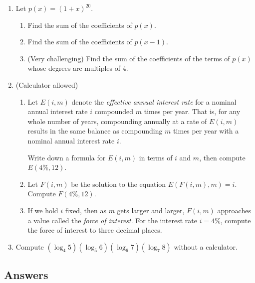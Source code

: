 \begin{enumerate}[resume]
\item Let $p(x) = (1 + x)^{20}$.
\begin{enumerate}
\item Find the sum of the coefficients of $p(x)$.
\item Find the sum of the coefficients of $p(x - 1)$.
\item (Very challenging) Find the sum of the coefficients of the terms of $p(x)$ whose degrees are multiples of $4$.
\end{enumerate}
\item (Calculator allowed)
\begin{enumerate}
\item Let $E(i,m)$ denote the \emph{effective annual interest rate} for a nominal annual interest rate $i$ compounded $m$ times per year. That is, for any whole number of years, compounding annually at a rate of $E(i,m)$ results in the same balance as compounding $m$ times per year with a nominal annual interest rate $i$.\par Write down a formula for $E(i,m)$ in terms of $i$ and $m$, then compute $E(4\%, 12)$.
\item Let $F(i,m)$ be the solution to the equation $E(F(i,m),m) = i$. Compute $F(4\%, 12)$.
\item If we hold $i$ fixed, then as $m$ gets larger and larger, $F(i,m)$ approaches a value called the \emph{force of interest}. For the interest rate $i = 4\%$, compute the force of interest to three decimal places.
\end{enumerate}
\item Compute $(\log_4 5)(\log_5 6)(\log_6 7)(\log_7 8)$ without a calculator.
\end{enumerate}


\newpage
\subsection{Answers}